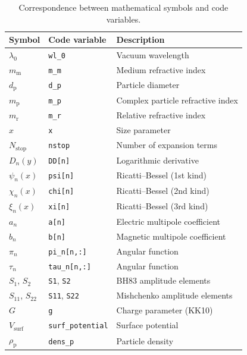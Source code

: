 \documentclass[a4paper,11pt]{article}
\begin{document}
\begin{table}[htbp]
  \caption{Correspondence between mathematical symbols and code variables.}
  \label{tab:variables}
  \centering
  \begin{tabular}{@{}lll@{}}
    \toprule
    Symbol & Code variable & Description \\
    \midrule
    $\lambda_0$        & \texttt{wl\_0}      & Vacuum wavelength \\
    $m_\mathrm{m}$     & \texttt{m\_m}       & Medium refractive index \\
    $d_\mathrm{p}$     & \texttt{d\_p}       & Particle diameter \\
    $m_\mathrm{p}$     & \texttt{m\_p}       & Complex particle refractive index \\
    $m_\mathrm{r}$     & \texttt{m\_r}       & Relative refractive index \\
    $x$                & \texttt{x}          & Size parameter \\
    $N_\mathrm{stop}$  & \texttt{nstop}      & Number of expansion terms \\
    $D_n(y)$           & \texttt{DD[n]}      & Logarithmic derivative \\
    $\psi_n(x)$        & \texttt{psi[n]}     & Ricatti--Bessel (1st kind) \\
    $\chi_n(x)$        & \texttt{chi[n]}     & Ricatti--Bessel (2nd kind) \\
    $\xi_n(x)$         & \texttt{xi[n]}      & Ricatti--Bessel (3rd kind) \\
    $a_n$              & \texttt{a[n]}       & Electric multipole coefficient \\
    $b_n$              & \texttt{b[n]}       & Magnetic multipole coefficient \\
    $\pi_n$            & \texttt{pi\_n[n,:]} & Angular function \\
    $\tau_n$           & \texttt{tau\_n[n,:]}& Angular function \\
    $S_1$, $S_2$       & \texttt{S1}, \texttt{S2}  & BH83 amplitude elements \\
    $S_{11}$, $S_{22}$ & \texttt{S11}, \texttt{S22} & Mishchenko amplitude elements \\
    $G$                & \texttt{g}          & Charge parameter (KK10) \\
    $V_\mathrm{surf}$  & \texttt{surf\_potential} & Surface potential \\
    $\rho_\mathrm{p}$  & \texttt{dens\_p}    & Particle density \\
    \bottomrule
  \end{tabular}
\end{table}
\end{document}
